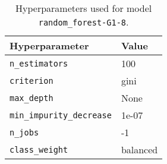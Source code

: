 \begin{table}[H]
\centering
\capstart
\begin{tabularx}{0.48\textwidth}{|X|l|}
\hline
Hyperparameter & Value \\
\hline
\texttt{n\_estimators} & 100 \\
\texttt{criterion} & gini \\
\texttt{max\_depth} & None \\
\texttt{min\_impurity\_decrease} & 1e-07 \\
\texttt{n\_jobs} & -1 \\
\texttt{class\_weight} & balanced \\
\hline
\end{tabularx}
\caption{Hyperparameters used for model \texttt{random\_forest-G1-8}.}
\label{tab:hyperparameters_best_random_forest}

\end{table}
